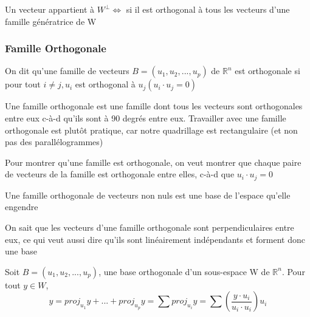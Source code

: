 \documentclass{article}
\begin{document}
\begin{theorem}
    Un vecteur appartient à $W^\perp \Longleftrightarrow$ si il est
    orthogonal à tous les vecteurs d'une famille génératrice de W
\end{theorem}

\subsubsection{Famille Orthogonale}

\begin{definition}
    On dit qu'une famille de vecteurs $B =(u_1, u_2, ... , u_p)$ de
    $\mathbb{R}^n$ est orthogonale si pour tout $i \neq j, u_i$ est
    orthogonal à $u_j(u_i \cdot u_j =0)$
\end{definition}

\begin{intuition}
    Une famille orthogonale est une famille dont tous les vecteurs
    sont orthogonales entre eux c-à-d qu'ils sont à 90 degrés entre eux.
    Travailler avec une famille orthogonale est plutôt pratique, car
    notre quadrillage est rectangulaire (et non pas des parallélogrammes)
\end{intuition}

\begin{problem}
    Pour montrer qu'une famille est orthogonale, on veut montrer
    que chaque paire de vecteurs de la famille est orthogonale
    entre elles, c-à-d que $u_i \cdot u_j =0$
\end{problem}

\begin{theorem}
    Une famille orthogonale de vecteurs non nuls est une base de
    l'espace qu'elle engendre
\end{theorem}

\begin{intuition}
    On sait que les vecteurs d'une famille orthogonale sont perpendiculaires
    entre eux, ce qui veut aussi dire qu'ils sont linéairement indépendants
    et forment donc une base
\end{intuition}

\begin{theorem}
    Soit $B =(u_1, u_2, ... , u_p)$, une base orthogonale d'un sous-espace
    W de $\mathbb{R}^n$. Pour tout $y \in W$,
    $$ y = proj_{u_1}y + ... + proj_{u_p}y = \sum proj_{u_i}y =
    \sum (\frac{y \cdot u_i}{u_i \cdot u_i}) u_i$$
\end{theorem}
\end{document}

